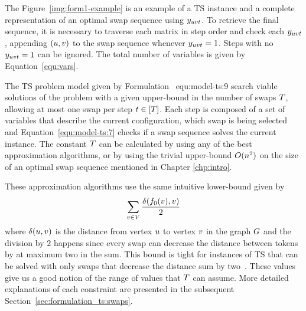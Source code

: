 \documentclass[msc,english,table,xcdraw]{ppgccufmg}
\begin{document}

The Figure~\ref{img:form1-example} is an example of a TS instance and a complete 
representation of an optimal swap sequence using $y_{uvt}$.
To retrieve the final sequence, it is necessary to traverse each matrix in step 
order and check each $y_{uvt}$, appending $(u,v)$ to 
the swap sequence whenever $y_{uvt} = 1$.
Steps with no $y_{uvt} = 1$ can be ignored.
The total number of variables is given by Equation~\ref{equ:vars}.


The TS problem model given by Formulation~
{equ:model-ts:9} search viable solutions of the problem with a given 
upper-bound in the number of swaps $T$, allowing at most one swap 
per step $t \in [T]$.
Each step is composed of a set of variables that describe the current 
configuration, which swap is being selected and Equation~\ref{equ:model-ts:7}
checks if a swap sequence solves the current instance.
The constant $T$ can be calculated by using any of the best 
approximation algorithms, or by using the trivial upper-bound $O(
n^{2})$ on the size of an optimal swap sequence mentioned in Chapter
\ref{chp:intro}.


These approximation algorithms use the same intuitive lower-bound given by
$$\sum_{v \in V} \frac{\delta(f_{0}(v), v)}
{2}$$ where $\delta(u, v)$ is the distance from vertex 
$u$ to vertex $v$ in the graph $G$ and the division by $2$ 
happens since every swap can decrease the distance between tokens by at maximum 
two in the sum.
This bound is tight for instances of TS that can be solved with only swaps
that decrease the distance sum by two~\citep{Bonnet:2018}.
These values give us a good notion of the range of values that $T$ can
assume.
More detailed explanations of each constraint are presented in the subsequent  
Section~\ref{sec:formulation_ts:swaps}.

\end{document}
